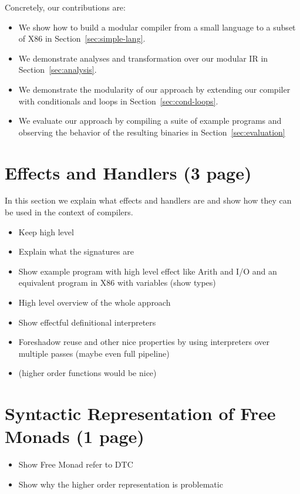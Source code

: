 \documentclass[sigplan,anonymous,review]{acmart}
\begin{document}
Concretely, our contributions are:
\begin{itemize}
  \item We show how to build a modular compiler from a small language to a subset of X86 in Section~\ref{sec:simple-lang}.
  \item We demonstrate analyses and transformation over our modular IR in Section~\ref{sec:analysis}.
  \item We demonstrate the modularity of our approach by extending our compiler with conditionals and loops in Section~\ref{sec:cond-loops}.
  \item We evaluate our approach by compiling a suite of example programs and observing the behavior of the resulting binaries in Section~\ref{sec:evaluation}
\end{itemize}

\section{Effects and Handlers (3 page)} \label{sec:effects-handlers}

In this section we explain what effects and handlers are and show how they can be used in the context of compilers.

\begin{itemize}
  \item Keep high level
  \item Explain what the signatures are
  \item Show example program with high level effect like Arith and I/O and an equivalent program in X86 with variables (show types)
  \item High level overview of the whole approach
  \item Show effectful definitional interpreters
  \item Foreshadow reuse and other nice properties by using interpreters over multiple passes (maybe even full pipeline)
  \item (higher order functions would be nice)
\end{itemize}

\section{Syntactic Representation of Free Monads (1 page)}
  
\begin{itemize}
\item Show Free Monad refer to DTC
\item Show why the higher order representation is problematic
\end{itemize}
\end{document}
